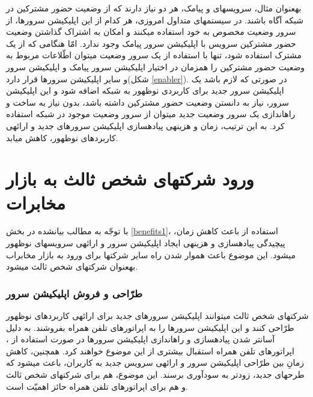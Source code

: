 به\nf عنوان مثال، سرویس\nf های  و پیامک، هر دو نیاز دارند که از وضعیت حضور مشترکین در شبکه آگاه باشند. در سیستم\nf های متداول امروزی، هر کدام از این اپلیکیشن سرورها، از سرور وضعیت مخصوص به خود استفاده می\nf کنند و امکان به اشتراک گذاشتن وضعیت حضور مشترکین سرویس  با اپلیکیشن سرور پیامک وجود ندارد. امّا هنگامی که از یک  مشترک استفاده شود، تنها با استفاده از یک سرور وضعیت می\nf توان اطّلاعات مربوط به وضعیت حضور مشترکین را هم\nf زمان در اختیار اپلیکیشن سرور پیامک و اپلیکیشن سرور  و سایر اپلیکیشن سرورها قرار دارد(شکل \ref{enabler}). در صورتی که لازم باشد یک اپلیکیشن سرور جدید برای کاربردی نوظهور به شبکه اضافه شود و این اپلیکیشن سرور، نیاز به دانستن وضعیت حضور مشترکین داشته باشد، بدون نیاز به ساخت و راه\nf اندازی یک سرور وضعیت جدید می\nf توان از سرور وضعیت موجود در شبکه استفاده کرد. به این ترتیب، زمان و هزینه\nf ی پیاده\nf سازی اپلیکیشن سرورهای جدید و ارائه\nf ی کاربردهای نوظهور، کاهش میابد\cite{blended}.

\section{ورود شرکت\nf های شخص ثالث به بازار مخابرات}
با توجّه به مطالب بیان\nf شده در بخش \ref{benefits1}، استفاده از  باعث کاهش زمان، پیچیدگی پیاده\nf  سازی و هزینه\nf ی ایجاد اپلیکیشن سرور و ارائه\nf ی سرویس\nf های نوظهور می\nf شود. این موضوع باعث هموار شدن راه سایر شرکت\nf ها برای ورود به بازار مخابراب به\nf عنوان شرکت\nf های شخص ثالث می\nf شود.

\subsubsection{طرّاحی و فروش اپلیکیشن سرور}

شرکت\nf های شخص ثالث می\nf توانند اپلیکیشن سرورهای جدید برای ارائه\nf ی کاربردهای نوظهور طرّاحی کنند و  این اپلیکیشن سرورها را به اپراتورهای تلفن همراه بفروشند. به دلیل آسان\nf تر شدن پیاده\nf سازی و راه\nf اندازی اپلیکیشن سرورها در صورت استفاده از ، اپراتورهای تلفن همراه استقبال بیشتری از این موضوع خواهند کرد. همچنین، کاهش زمانِ بین طرّاحی اپلیکیشن سرور و ارائه\nf ی سرویس جدید به کاربران، باعث می\nf شود که طرح\nf های جدید، زودتر به سودآوری برسند. این موضوع، هم برای شرکت\nf های شخص ثالث و هم برای اپراتورهای تلفن همراه حائز اهمیّت است. 

